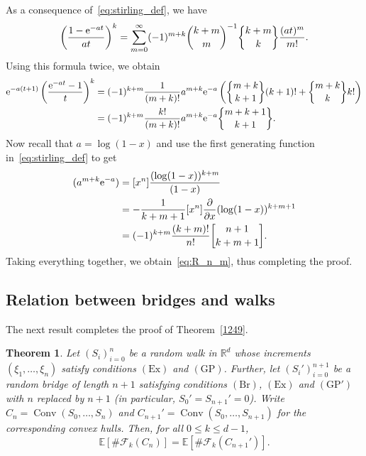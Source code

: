\documentclass[12pt, reqno]{amsart}
\theoremstyle{plain}
\newtheorem{theorem}{Theorem}[section]
\theoremstyle{definition}
\theoremstyle{remark}
\begin{document}
As a consequence of~\eqref{eq:stirling_def}, we have
$$
\left( \frac {1-{{\rm e}}^{-at}}{at}\right)^{k} = \sum_{m=0}^{\infty} (-1)^{m+k} \binom{k+m}{m}^{-1} {\genfrac{\{}{\}}{0pt}{}{{k+m}}{{k}}} \frac{(at)^m}{m!}.
$$
Using this formula twice, we obtain
\begin{align*}
[t^m] {{\rm e}}^{-a(t+1)} \left(\frac{{{\rm e}}^{-at} - 1}{t}\right)^k
&=
(-1)^{k+m} \frac{1}{(m+k)!} a^{m+k}{{\rm e}}^{-a}  \left({\genfrac{\{}{\}}{0pt}{}{{m+k}}{{k+1}}}(k+1)! +{\genfrac{\{}{\}}{0pt}{}{{m+k}}{{k}}}k!\right)\\
&=
(-1)^{k+m} \frac{k!}{(m+k)!} a^{m+k}{{\rm e}}^{-a} {\genfrac{\{}{\}}{0pt}{}{{m+k+1}}{{k+1}}}.
\end{align*}
Now recall that $a= \log (1-x)$ and use the first generating function in~\eqref{eq:stirling_def} to get
\begin{align*}
[x^n](a^{m+k}{{\rm e}}^{-a})
&=
[x^n] \frac{(\log (1-x))^{k+m}}{(1-x)}\\
&=
-\frac 1{k+m+1} [x^n] \frac{\partial}{\partial x} (\log (1-x))^{k+m+1}\\
&=
(-1)^{k+m}  \frac{(k+m)!}{n!} {\genfrac{[}{]}{0pt}{}{{n+1}}{{k+m+1}}}.
\end{align*}
Taking everything together, we obtain~\eqref{eq:R_n_m}, thus completing the proof.

\subsection{Relation between bridges and walks}\label{subsec:walks_equals_bridge}
The next result completes the proof of Theorem~\ref{1249}.
\begin{theorem}\label{1455}
Let $(S_i)_{i=0}^n$ be a random walk in ${\mathbb{R}}^d$ whose increments $(\xi_1,\ldots,\xi_n)$ satisfy conditions $(\text{Ex})$ and $(\text{GP})$. Further, let $(S_i')_{i=0}^{n+1}$ be a random bridge of length $n+1$  satisfying conditions $(\text{Br})$, $(\text{Ex})$ and $(\text{GP}')$ with $n$ replaced by $n+1$ (in particular, $S_0'=S_{n+1}'=0$). Write $C_n={\mathop{\mathrm{Conv}}\nolimits}(S_0,\ldots,S_n)$ and $C_{n+1}'= {\mathop{\mathrm{Conv}}\nolimits}(S_0,\ldots,S_{n+1})$ for the corresponding convex hulls. Then, for all $0\leq k \leq d-1$,
\begin{equation}\label{1613}
{\mathbb E} [\#\mathcal{F}_k(C_n)] =
{\mathbb E} [\#\mathcal{F}_k(C_{n+1}')].
\end{equation}
\end{theorem}
\end{document}
